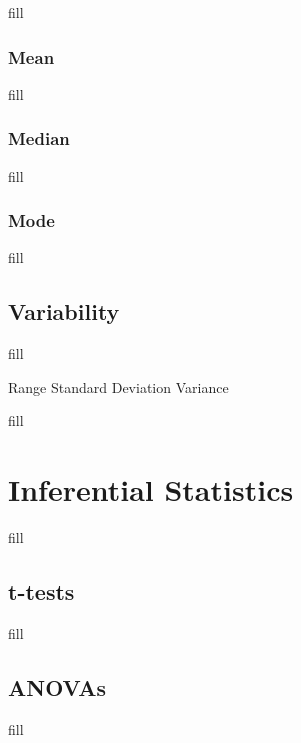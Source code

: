 \documentclass[
  b5paper]{book}
\begin{document}
fill

\hypertarget{mean}{%
\subsubsection*{Mean}\label{mean}}

fill

\hypertarget{median}{%
\subsubsection*{Median}\label{median}}

fill

\hypertarget{mode}{%
\subsubsection*{Mode}\label{mode}}

fill

\hypertarget{variability}{%
\subsection*{Variability}\label{variability}}

fill

Range Standard Deviation Variance

fill

\hypertarget{inferential-statistics}{%
\section{Inferential Statistics}\label{inferential-statistics}}

fill

\hypertarget{t-tests}{%
\subsection*{t-tests}\label{t-tests}}

fill

\hypertarget{anovas}{%
\subsection*{ANOVAs}\label{anovas}}

fill
\end{document}
